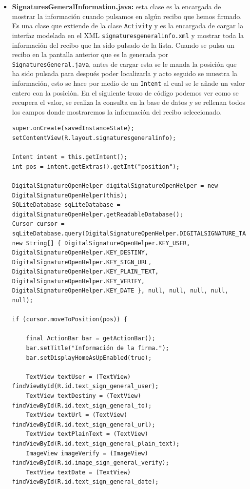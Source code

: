 \begin{itemize}
\item \textbf{SignaturesGeneralInformation.java:} esta clase es la encargada de mostrar la información cuando pulsamos en algún recibo que hemos firmado. Es una clase que extiende de la clase \lstinline{Activity} y es la encargada de cargar la interfaz modelada en el XML \lstinline{signaturesgeneralinfo.xml} y mostrar toda la información del recibo que ha sido pulsado de la lista. Cuando se pulsa un recibo en la pantalla anterior que es la generada por \lstinline{SignaturesGeneral.java}, antes de cargar esta se le manda la posición que ha sido pulsada para después poder localizarla y acto seguido se muestra la información, esto se hace por medio de un \lstinline{Intent} al cual se le añade un valor entero con la posición. En el siguiente trozo de código podemos ver como se recupera el valor, se realiza la consulta en la base de datos y se rellenan todos los campos donde mostraremos la información del recibo seleccionado.

\begin{lstlisting}[style=Java]
super.onCreate(savedInstanceState);
setContentView(R.layout.signaturesgeneralinfo);

Intent intent = this.getIntent();
int pos = intent.getExtras().getInt("position");

DigitalSignatureOpenHelper digitalSignatureOpenHelper = new DigitalSignatureOpenHelper(this);
SQLiteDatabase sqLiteDatabase = digitalSignatureOpenHelper.getReadableDatabase();
Cursor cursor = sqLiteDatabase.query(DigitalSignatureOpenHelper.DIGITALSIGNATURE_TABLE_NAME, new String[] { DigitalSignatureOpenHelper.KEY_USER, DigitalSignatureOpenHelper.KEY_DESTINY, DigitalSignatureOpenHelper.KEY_SIGN_URL, DigitalSignatureOpenHelper.KEY_PLAIN_TEXT, DigitalSignatureOpenHelper.KEY_VERIFY, DigitalSignatureOpenHelper.KEY_DATE }, null, null, null, null, null);

if (cursor.moveToPosition(pos)) {
	
	final ActionBar bar = getActionBar();
	bar.setTitle("Información de la firma.");
	bar.setDisplayHomeAsUpEnabled(true);

	TextView textUser = (TextView) findViewById(R.id.text_sign_general_user);
	TextView textDestiny = (TextView) findViewById(R.id.text_sign_general_to);
	TextView textUrl = (TextView) findViewById(R.id.text_sign_general_url);
	TextView textPlainText = (TextView) findViewById(R.id.text_sign_general_plain_text);
	ImageView imageVerify = (ImageView) findViewById(R.id.image_sign_general_verify);
	TextView textDate = (TextView) findViewById(R.id.text_sign_general_date);
	

\end{lstlisting}
\end{itemize}

